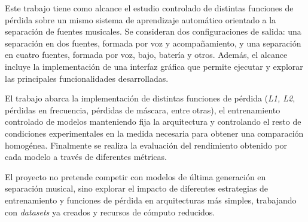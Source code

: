 Este trabajo tiene como alcance el estudio controlado de distintas funciones de pérdida sobre un mismo sistema de aprendizaje automático orientado a la separación de fuentes musicales. Se consideran dos configuraciones de salida: una separación en dos fuentes, formada por voz y acompañamiento, y una separación en cuatro fuentes, formada por voz, bajo, batería y otros. Además, el alcance incluye la implementación de una interfaz gráfica que permite ejecutar y explorar las principales funcionalidades desarrolladas.

El trabajo abarca la implementación de distintas funciones de pérdida (\textit{L1, L2}, pérdidas en frecuencia, pérdidas de máscara, entre otras), el entrenamiento controlado de modelos manteniendo fija la arquitectura y controlando el resto de condiciones experimentales en la medida necesaria para obtener una comparación homogénea. Finalmente se realiza la evaluación del rendimiento obtenido por cada modelo a través de diferentes métricas.

El proyecto no pretende competir con modelos de última generación en separación musical, sino explorar el impacto de diferentes estrategias de entrenamiento y funciones de pérdida en arquitecturas más simples, trabajando con \textit{datasets} ya creados y recursos de cómputo reducidos.

\clearpage
